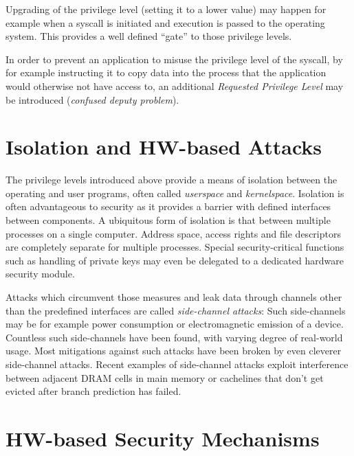 Upgrading of the privilege level (setting it to a lower value) may happen for
example when a syscall is initiated and execution is passed to the operating
system. This provides a well defined ``gate'' to those privilege levels.

In order to prevent an application to misuse the privilege level of the syscall,
by for example instructing it to copy data into the process that the application
would otherwise not have access to, an additional \textit{Requested Privilege
Level} may be introduced (\emph{confused deputy problem}).

\section{Isolation and HW-based Attacks}
The privilege levels introduced above provide a means of isolation between the
operating and user programs, often called \textit{userspace} and
\textit{kernelspace}. Isolation is often advantageous to security as it provides
a barrier with defined interfaces between components. A ubiquitous form of
isolation is that between multiple processes on a single computer. Address
space, access rights and file descriptors are completely separate for multiple
processes. Special security-critical functions such as handling of private keys
may even be delegated to a dedicated hardware security module.

Attacks which circumvent those measures and leak data through channels other
than the predefined interfaces are called \emph{side-channel attacks}: Such
side-channels may be for example power consumption or electromagnetic emission
of a device. Countless such side-channels have been found, with varying degree
of real-world usage. Most mitigations against such attacks have been broken by
even cleverer side-channel attacks. Recent examples of side-channel attacks
exploit interference between adjacent DRAM cells in main memory or cachelines
that don't get evicted after branch prediction has failed.

\section{HW-based Security Mechanisms}